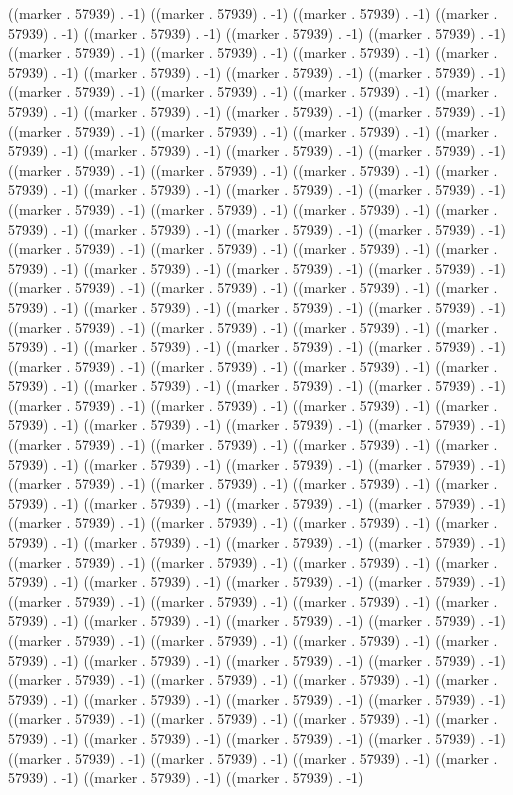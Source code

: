 ((marker . 57939) . -1) ((marker . 57939) . -1) ((marker . 57939) . -1) ((marker . 57939) . -1) ((marker . 57939) . -1) ((marker . 57939) . -1) ((marker . 57939) . -1) ((marker . 57939) . -1) ((marker . 57939) . -1) ((marker . 57939) . -1) ((marker . 57939) . -1) ((marker . 57939) . -1) ((marker . 57939) . -1) ((marker . 57939) . -1) ((marker . 57939) . -1) ((marker . 57939) . -1) ((marker . 57939) . -1) ((marker . 57939) . -1) ((marker . 57939) . -1) ((marker . 57939) . -1) ((marker . 57939) . -1) ((marker . 57939) . -1) ((marker . 57939) . -1) ((marker . 57939) . -1) ((marker . 57939) . -1) ((marker . 57939) . -1) ((marker . 57939) . -1) ((marker . 57939) . -1) ((marker . 57939) . -1) ((marker . 57939) . -1) ((marker . 57939) . -1) ((marker . 57939) . -1) ((marker . 57939) . -1) ((marker . 57939) . -1) ((marker . 57939) . -1) ((marker . 57939) . -1) ((marker . 57939) . -1) ((marker . 57939) . -1) ((marker . 57939) . -1) ((marker . 57939) . -1) ((marker . 57939) . -1) ((marker . 57939) . -1) ((marker . 57939) . -1) ((marker . 57939) . -1) ((marker . 57939) . -1) ((marker . 57939) . -1) ((marker . 57939) . -1) ((marker . 57939) . -1) ((marker . 57939) . -1) ((marker . 57939) . -1) ((marker . 57939) . -1) ((marker . 57939) . -1) ((marker . 57939) . -1) ((marker . 57939) . -1) ((marker . 57939) . -1) ((marker . 57939) . -1) ((marker . 57939) . -1) ((marker . 57939) . -1) ((marker . 57939) . -1) ((marker . 57939) . -1) ((marker . 57939) . -1) ((marker . 57939) . -1) ((marker . 57939) . -1) ((marker . 57939) . -1) ((marker . 57939) . -1) ((marker . 57939) . -1) ((marker . 57939) . -1) ((marker . 57939) . -1) ((marker . 57939) . -1) ((marker . 57939) . -1) ((marker . 57939) . -1) ((marker . 57939) . -1) ((marker . 57939) . -1) ((marker . 57939) . -1) ((marker . 57939) . -1) ((marker . 57939) . -1) ((marker . 57939) . -1) ((marker . 57939) . -1) ((marker . 57939) . -1) ((marker . 57939) . -1) ((marker . 57939) . -1) ((marker . 57939) . -1) ((marker . 57939) . -1) ((marker . 57939) . -1) ((marker . 57939) . -1) ((marker . 57939) . -1) ((marker . 57939) . -1) ((marker . 57939) . -1) ((marker . 57939) . -1) ((marker . 57939) . -1) ((marker . 57939) . -1) ((marker . 57939) . -1) ((marker . 57939) . -1) ((marker . 57939) . -1) ((marker . 57939) . -1) ((marker . 57939) . -1) ((marker . 57939) . -1) ((marker . 57939) . -1) ((marker . 57939) . -1) ((marker . 57939) . -1) ((marker . 57939) . -1) ((marker . 57939) . -1) ((marker . 57939) . -1) ((marker . 57939) . -1) ((marker . 57939) . -1) ((marker . 57939) . -1) ((marker . 57939) . -1) ((marker . 57939) . -1) ((marker . 57939) . -1) ((marker . 57939) . -1) ((marker . 57939) . -1) ((marker . 57939) . -1) ((marker . 57939) . -1) ((marker . 57939) . -1) ((marker . 57939) . -1) ((marker . 57939) . -1) ((marker . 57939) . -1) ((marker . 57939) . -1) ((marker . 57939) . -1) ((marker . 57939) . -1) ((marker . 57939) . -1) ((marker . 57939) . -1) ((marker . 57939) . -1) ((marker . 57939) . -1) ((marker . 57939) . -1) ((marker . 57939) . -1) ((marker . 57939) . -1) ((marker . 57939) . -1) ((marker . 57939) . -1) ((marker . 57939) . -1) ((marker . 57939) . -1) ((marker . 57939) . -1) ((marker . 57939) . -1) ((marker . 57939) . -1) ((marker . 57939) . -1) ((marker . 57939) . -1) ((marker . 57939) . -1) ((marker . 57939) . -1) ((marker . 57939) . -1) 